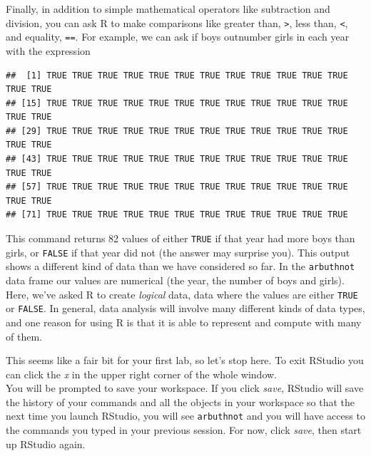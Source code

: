 \documentclass[]{article}
\newenvironment{Shaded}{\begin{snugshade}}{\end{snugshade}}
\newcommand{\StringTok}[1]{\textcolor[rgb]{0.31,0.60,0.02}{#1}}
\newcommand{\OperatorTok}[1]{\textcolor[rgb]{0.81,0.36,0.00}{\textbf{#1}}}
\newcommand{\NormalTok}[1]{#1}
\begin{document}
Finally, in addition to simple mathematical operators like subtraction
and division, you can ask R to make comparisons like greater than,
\texttt{\textgreater{}}, less than, \texttt{\textless{}}, and equality,
\texttt{==}. For example, we can ask if boys outnumber girls in each
year with the expression

\begin{Shaded}
\end{Shaded}

\begin{verbatim}
##  [1] TRUE TRUE TRUE TRUE TRUE TRUE TRUE TRUE TRUE TRUE TRUE TRUE TRUE TRUE
## [15] TRUE TRUE TRUE TRUE TRUE TRUE TRUE TRUE TRUE TRUE TRUE TRUE TRUE TRUE
## [29] TRUE TRUE TRUE TRUE TRUE TRUE TRUE TRUE TRUE TRUE TRUE TRUE TRUE TRUE
## [43] TRUE TRUE TRUE TRUE TRUE TRUE TRUE TRUE TRUE TRUE TRUE TRUE TRUE TRUE
## [57] TRUE TRUE TRUE TRUE TRUE TRUE TRUE TRUE TRUE TRUE TRUE TRUE TRUE TRUE
## [71] TRUE TRUE TRUE TRUE TRUE TRUE TRUE TRUE TRUE TRUE TRUE TRUE
\end{verbatim}

This command returns 82 values of either \texttt{TRUE} if that year had
more boys than girls, or \texttt{FALSE} if that year did not (the answer
may surprise you). This output shows a different kind of data than we
have considered so far. In the \texttt{arbuthnot} data frame our values
are numerical (the year, the number of boys and girls). Here, we've
asked R to create \emph{logical} data, data where the values are either
\texttt{TRUE} or \texttt{FALSE}. In general, data analysis will involve
many different kinds of data types, and one reason for using R is that
it is able to represent and compute with many of them.

This seems like a fair bit for your first lab, so let's stop here. To
exit RStudio you can click the \emph{x} in the upper right corner of the
whole window.\\
You will be prompted to save your workspace. If you click \emph{save},
RStudio will save the history of your commands and all the objects in
your workspace so that the next time you launch RStudio, you will see
\texttt{arbuthnot} and you will have access to the commands you typed in
your previous session. For now, click \emph{save}, then start up RStudio
again.
\end{document}

